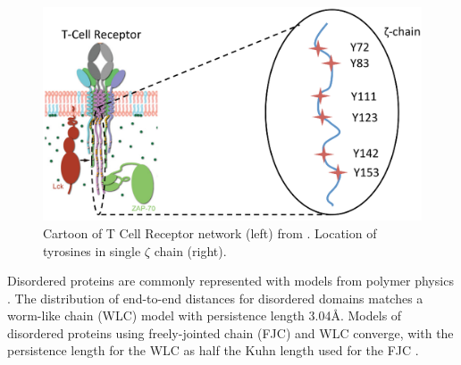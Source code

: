 \documentclass[../AdvancementSummary.tex]{subfiles}
\begin{document}
\begin{figure}
	\begin{center}
		\includegraphics[width=0.8\linewidth]{Figures/TCRDiagram.eps}
	\end{center}
\caption{Cartoon of T Cell Receptor network (left) from \cite{Wu2015}. Location of tyrosines in single $\zeta$ chain (right). \label{fig: TCRCartoon}}
\end{figure}


%
%

Disordered proteins are commonly represented with models from polymer physics \cite{VanValen2009, Reeves2011}. The distribution of end-to-end distances for disordered domains matches a worm-like chain (WLC) model with persistence length 3.04\AA \cite{Zhou2001}. Models of disordered proteins using freely-jointed chain (FJC) and WLC converge, with the persistence length for the WLC as half the Kuhn length used for the FJC \cite{VanValen2009}.
\end{document}
